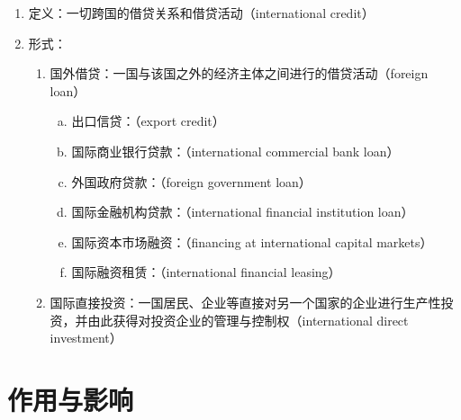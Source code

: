 \documentclass[12pt]{book}
\begin{document}
\begin{enumerate}[1.]
    \item 定义：一切跨国的借贷关系和借贷活动（international credit）
    \item 形式：
          \begin{enumerate}[(1)]
              \item 国外借贷：一国与该国之外的经济主体之间进行的借贷活动（foreign loan）
                    \begin{enumerate}[a.]
                        \item 出口信贷：（export credit）
                        \item 国际商业银行贷款：（international commercial bank loan）
                        \item 外国政府贷款：（foreign government loan）
                        \item 国际金融机构贷款：（international financial institution loan）
                        \item 国际资本市场融资：（financing at international capital markets）
                        \item 国际融资租赁：（international financial leasing）
                    \end{enumerate}
              \item 国际直接投资：一国居民、企业等直接对另一个国家的企业进行生产性投资，并由此获得对投资企业的管理与控制权（international direct investment）
          \end{enumerate}
\end{enumerate}


\section{作用与影响}
\end{document}
